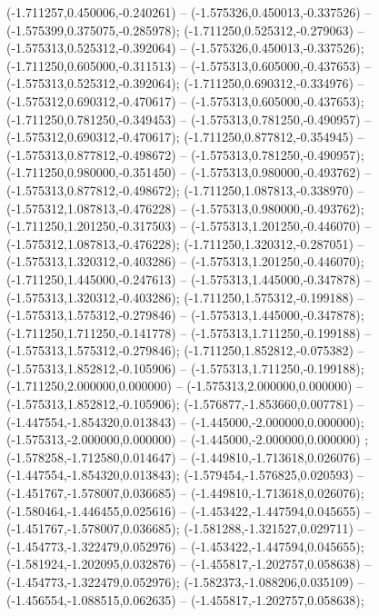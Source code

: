 (-1.711257,0.450006,-0.240261) -- (-1.575326,0.450013,-0.337526) -- (-1.575399,0.375075,-0.285978);
 (-1.711250,0.525312,-0.279063) -- (-1.575313,0.525312,-0.392064) -- (-1.575326,0.450013,-0.337526);
 (-1.711250,0.605000,-0.311513) -- (-1.575313,0.605000,-0.437653) -- (-1.575313,0.525312,-0.392064);
 (-1.711250,0.690312,-0.334976) -- (-1.575312,0.690312,-0.470617) -- (-1.575313,0.605000,-0.437653);
 (-1.711250,0.781250,-0.349453) -- (-1.575313,0.781250,-0.490957) -- (-1.575312,0.690312,-0.470617);
 (-1.711250,0.877812,-0.354945) -- (-1.575313,0.877812,-0.498672) -- (-1.575313,0.781250,-0.490957);
 (-1.711250,0.980000,-0.351450) -- (-1.575313,0.980000,-0.493762) -- (-1.575313,0.877812,-0.498672);
 (-1.711250,1.087813,-0.338970) -- (-1.575312,1.087813,-0.476228) -- (-1.575313,0.980000,-0.493762);
 (-1.711250,1.201250,-0.317503) -- (-1.575313,1.201250,-0.446070) -- (-1.575312,1.087813,-0.476228);
 (-1.711250,1.320312,-0.287051) -- (-1.575313,1.320312,-0.403286) -- (-1.575313,1.201250,-0.446070);
 (-1.711250,1.445000,-0.247613) -- (-1.575313,1.445000,-0.347878) -- (-1.575313,1.320312,-0.403286);
 (-1.711250,1.575312,-0.199188) -- (-1.575313,1.575312,-0.279846) -- (-1.575313,1.445000,-0.347878);
 (-1.711250,1.711250,-0.141778) -- (-1.575313,1.711250,-0.199188) -- (-1.575313,1.575312,-0.279846);
 (-1.711250,1.852812,-0.075382) -- (-1.575313,1.852812,-0.105906) -- (-1.575313,1.711250,-0.199188);
 (-1.711250,2.000000,0.000000) -- (-1.575313,2.000000,0.000000) -- (-1.575313,1.852812,-0.105906);
 (-1.576877,-1.853660,0.007781) -- (-1.447554,-1.854320,0.013843) -- (-1.445000,-2.000000,0.000000);
 (-1.575313,-2.000000,0.000000) -- (-1.445000,-2.000000,0.000000) ;
 (-1.578258,-1.712580,0.014647) -- (-1.449810,-1.713618,0.026076) -- (-1.447554,-1.854320,0.013843);
 (-1.579454,-1.576825,0.020593) -- (-1.451767,-1.578007,0.036685) -- (-1.449810,-1.713618,0.026076);
 (-1.580464,-1.446455,0.025616) -- (-1.453422,-1.447594,0.045655) -- (-1.451767,-1.578007,0.036685);
 (-1.581288,-1.321527,0.029711) -- (-1.454773,-1.322479,0.052976) -- (-1.453422,-1.447594,0.045655);
 (-1.581924,-1.202095,0.032876) -- (-1.455817,-1.202757,0.058638) -- (-1.454773,-1.322479,0.052976);
 (-1.582373,-1.088206,0.035109) -- (-1.456554,-1.088515,0.062635) -- (-1.455817,-1.202757,0.058638);
